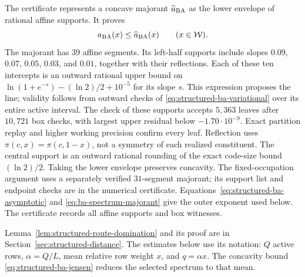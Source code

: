 The certificate represents a concave majorant $\widehat a_{\rm BA}$ as the
lower envelope of rational affine supports. It proves
\begin{equation}
  a_{\rm BA}(x)\le\widehat a_{\rm BA}(x)
  \qquad(x\in\mathcal W).
  \label{eq:ba-spectrum-majorant}
\end{equation}
The majorant has $39$ affine segments. Its left-half supports include
slopes $0.09$, $0.07$, $0.05$, $0.03$, and $0.01$, together with their
reflections. Each of these ten intercepts is an outward rational upper
bound on $\ln(1+e^{-s})-(\ln2)/2+10^{-5}$ for its slope $s$.
This expression proposes the line; validity follows from outward checks of
\eqref{eq:structured-ba-variational} over its entire active interval.
The check of these supports accepts $5{,}363$ leaves after $10{,}721$ box checks, with
largest upper residual below $-1.70\cdot10^{-9}$. Exact partition replay
and higher working precision confirm every leaf. Reflection uses
$\pi(c,x)=\pi(c,1-x)$, not a symmetry of each realized constituent.
The central support is an outward rational rounding of the exact
code-size bound $(\ln2)/2$. Taking the lower envelope preserves
concavity. The fixed-occupation argument uses a separately verified
$31$-segment majorant; its support list and endpoint checks are in
the numerical certificate\repositorycite.
Equations~\eqref{eq:structured-ba-asymptotic} and
\eqref{eq:ba-spectrum-majorant} give the outer exponent used below. The
certificate records all affine supports and box witnesses.

Lemma~\ref{lem:structured-route-domination} and its proof are in
Section~\ref{sec:structured-distance}. The estimates below use its notation:
$Q$ active rows, $\alpha=Q/L$, mean relative row weight $x$, and
$q=\alpha x$. The concavity bound
\eqref{eq:structured-ba-jensen} reduces the selected spectrum to that mean.


